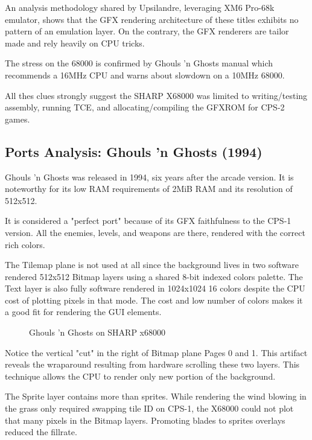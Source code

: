 An analysis methodology shared by Upsilandre\cite{x68k_games_analysis}, leveraging XM6 Pro-68k emulator, shows that the GFX rendering architecture of these titles exhibits no pattern of an emulation layer. On the contrary, the GFX renderers are tailor made and rely heavily on CPU tricks. 

\begin{trivia}
The stress on the 68000 is confirmed by Ghouls 'n Ghosts manual which recommends a 16MHz CPU and warns about slowdown on a 10MHz 68000.
\end{trivia}

All thes clues strongly suggest the SHARP X68000 was limited to writing/testing assembly, running TCE, and allocating/compiling the GFXROM for CPS-2 games.



\subsection{Ports Analysis: Ghouls 'n Ghosts (1994)}
Ghouls 'n Ghosts was released in 1994, six years after the arcade version. It is noteworthy for its low RAM requirements of 2MiB RAM and its resolution of 512x512.

It is considered a "perfect port" because of its GFX faithfulness to the CPS-1 version. All the enemies, levels, and weapons are there, rendered with the correct rich colors. 

The Tilemap plane is not used at all since the background lives in two software rendered 512x512 Bitmap layers using a shared 8-bit indexed colors palette. The Text layer is also fully software rendered in 1024x1024 16 colors despite the CPU cost of plotting pixels in that mode. The cost and low number of colors makes it a good fit for rendering the GUI elements.

\begin{figure}[H]
\caption*{Ghouls 'n Ghosts on SHARP x68000}
\end{figure}


Notice the vertical "cut" in the right of Bitmap plane Pages 0 and 1. This artifact reveals the wraparound resulting from hardware scrolling these two layers. This technique allows the CPU to render only new portion of the background. 

The Sprite layer contains more than sprites. While rendering the wind blowing in the grass only required swapping tile ID on CPS-1, the X68000 could not plot that many pixels in the Bitmap layers. Promoting blades to sprites overlays reduced the fillrate.

